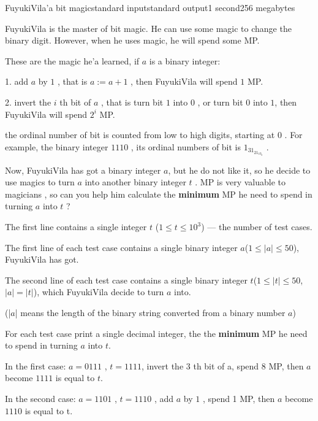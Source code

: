 \begin{problem}{FuyukiVila'a bit magic}{standard input}{standard output}{1 second}{256 megabytes}

    FuyukiVila is the master of bit magic. He can use some magic to change the binary digit.  However, when he uses magic, he will spend some MP.
    
    These are the magic he'a learned, if $a$ is a binary integer:
    
    1. add $a$ by $1$ , that is $a := a + 1$ , then FuyukiVila will spend $1$ MP.
    
    2. invert the $i$ th  bit of $a$ ,  that is turn bit $1$ into $0$ , or turn bit $0$ into $1$, then FuyukiVila will spend $2^i$ MP.
    
    the ordinal number of bit is counted from low to high digits, starting at $0$ . For example, the binary integer $1110$ , its ordinal numbers of bit is $1_31_21_10_0$ .
    
    Now, FuyukiVila has got a binary integer $a$, but he do not like it, so he decide to use magics to turn $a$ into another binary integer $t$ . MP is very valuable to magicians , so can you help him calculate the \textbf{minimum} MP he need to spend in turning $a$ into $t$ ?
    
    \InputFile
    The first line contains a single integer $t$ ($1 \le t \le 10^3$) --- the number of test cases.
    
    The first line of each test case contains a single binary integer $a$($1\leq |a| \leq 50$), FuyukiVila has got.
    
    The second line of each test case contains a single binary integer $t$($1\leq |t| \leq 50$, $|a| = |t|$), which FuyukiVila decide to turn $a$ into.
    
    (|$a$| means the length of the binary string converted from a binary number $a$)
    
    \OutputFile
    For each test case print a single decimal integer, the the \textbf{minimum} MP he need to spend in turning $a$ into $t$.
    
    \Example
    
    \begin{example}
    \end{example}
    
    \Note
    In the first case: $a = 0111$ , $t = 1111$, invert the $3$ th bit of a, spend 8 MP, then $a$ become $1111$ is equal to $t$.
    
    In the second case: $a = 1101$ , $t = 1110$ , add $a$ by $1$ , spend 1 MP, then $a$ become $1110$ is equal to t.
    
    \end{problem}